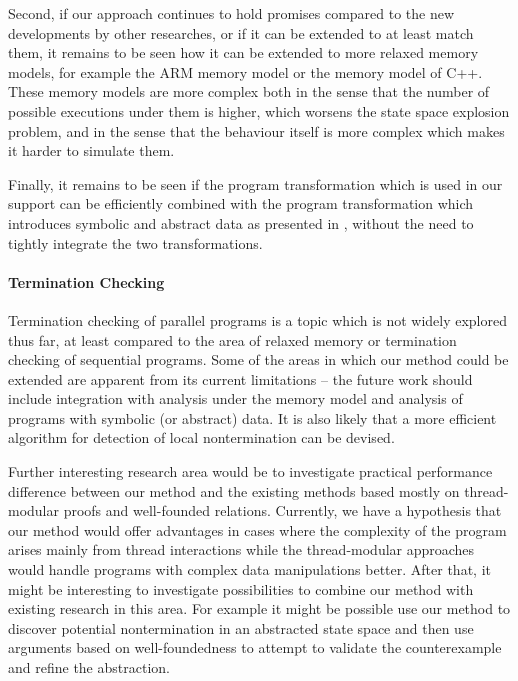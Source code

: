 Second, if our approach continues to hold promises compared to the new developments by other researches, or if it can be extended to at least match them, it remains to be seen how it can be extended to more relaxed memory models, for example the ARM memory model or the memory model of C++.
These memory models are more complex both in the sense that the number of possible executions under them is higher, which worsens the state space explosion problem, and in the sense that the behaviour itself is more complex which makes it harder to simulate them.

Finally, it remains to be seen if the program transformation which is used in our \xtso support can be efficiently combined with the program transformation which introduces symbolic and abstract data as presented in , without the need to tightly integrate the two transformations.

\paragraph{Termination Checking}

Termination checking of parallel programs is a topic which is not widely explored thus far, at least compared to the area of relaxed memory or termination checking of sequential programs.
Some of the areas in which our method could be extended are apparent from its current limitations -- the future work should include integration with analysis under the \xtso memory model and analysis of programs with symbolic (or abstract) data.
It is also likely that a more efficient algorithm for detection of local nontermination can be devised.

Further interesting research area would be to investigate practical performance difference between our method and the existing methods based mostly on thread-modular proofs and well-founded relations.
Currently, we have a hypothesis that our method would offer advantages in cases where the complexity of the program arises mainly from thread interactions while the thread-modular approaches would handle programs with complex data manipulations better.
After that, it might be interesting to investigate possibilities to combine our method with existing research in this area.
For example it might be possible use our method to discover potential nontermination in an abstracted state space and then use arguments based on well-foundedness to attempt to validate the counterexample and refine the abstraction.

